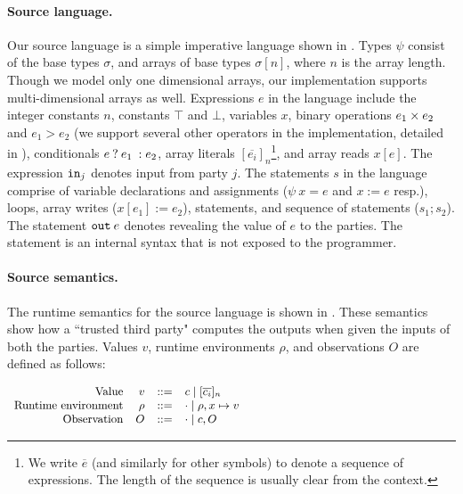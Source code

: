 \paragraph{Source language.} Our source language
 is a simple imperative language shown in . Types
$\psi$ consist of the base types $\sigma$, and arrays
of base types $\sigma[n]$, where $n$ is the array length. Though we
model only one dimensional arrays, our implementation supports
 multi-dimensional arrays as well. Expressions $e$ in the language include the
 integer constants $n$,  constants $\top$ and $\bot$,
variables $x$, binary operations $e_{1} \times e_{2}$ and $e_{1} >
e_{2}$ (we support several other
operators in the implementation, detailed in ),
conditionals ${{e}\:?\:{e_{1}}\::{e_{2}}}$,
array literals
$[\overline{e_{i}}]_{n}$\footnote{We write $\overline{e}$ (and
  similarly for other symbols) to denote a sequence of expressions.
The length of the sequence is usually clear from the context.}, and
array reads $x[e]$. The expression ${\mathtt{in}}_{j}$ denotes input from
party $j$. The statements $s$ in the language comprise of variable
declarations and assignments ($\psi\:x = e$ and $x := e$ resp.),
 loops, array writes ($x[e_{1}] := e_{2}$), 
statements, and sequence of statements ($s_{1}; s_{2}$). The statement
${\mathtt{out}}\:e$ denotes revealing the value of $e$ to the
parties. The  statement is an internal syntax that is not
exposed to the programmer. \\

\paragraph{Source semantics.} The runtime semantics for the source language is shown in
. These semantics show how a ``trusted third party" computes the outputs when given the inputs of both the parties. 
 Values $v$, runtime environments $\rho$, and
observations $O$ are defined as follows:

\vspace{0.1cm}
$
\small
\begin{array}{rrcl}
    \text{\small{Value}} & v &::=& c \mid [\overline{c_{i}}]_{n}\\
    \text{\small{Runtime environment}} & \rho &::=& \cdot \mid \rho,x \mapsto v\\
    \text{\small{Observation}} & O & ::= & \cdot \mid c, O \\
\end{array}
$

